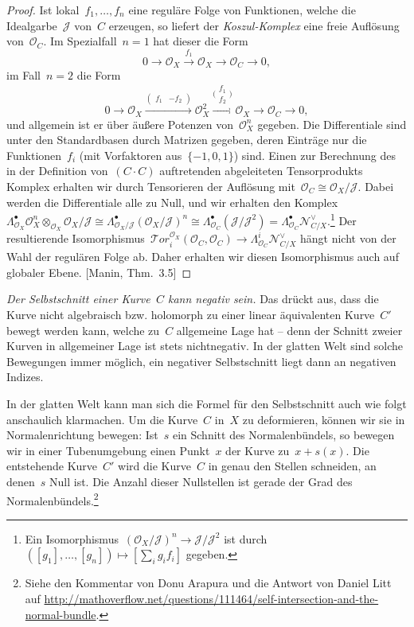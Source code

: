 \documentclass[a4paper,ngerman,12pt]{scrartcl}
\theoremstyle{definition}
\theoremstyle{plain}
\theoremstyle{remark}
\newcommand{\N}{\mathcal{N}}
\newcommand{\J}{\mathcal{J}}
\renewcommand{\O}{\mathcal{O}}
\newcommand{\lra}{\longrightarrow}
\begin{document}
\begin{proof}Ist lokal~$f_1,\ldots,f_n$ eine reguläre Folge von
Funktionen, welche die Idealgarbe~$\J$ von~$C$ erzeugen, so liefert der
\emph{Koszul-Komplex} eine freie Auflösung von~$\O_C$. Im Spezialfall~$n = 1$
hat dieser die Form
\[ 0 \lra \O_X \stackrel{f_1} \lra \O_X \lra \O_C \lra 0, \]
im Fall~$n = 2$ die Form
\[ 0 \lra \O_X \stackrel{(\begin{smallmatrix}f_1&-f_2\end{smallmatrix})} \lra \O_X^2
  \stackrel{\bigl(\begin{smallmatrix}f_1\\f_2\end{smallmatrix}\bigr)}{\lra} \O_X \lra \O_C \lra 0,
  \]
und allgemein ist er über äußere Potenzen von~$\O_X^n$ gegeben. Die Differentiale
sind unter den Standardbasen durch Matrizen gegeben, deren Einträge nur
die Funktionen~$f_i$ (mit Vorfaktoren aus~$\{-1,0,1\}$) sind. Einen zur
Berechnung des in der Definition von~$(C \cdot C)$ auftretenden abgeleiteten
Tensorprodukts Komplex erhalten wir durch Tensorieren der Auflösung mit~$\O_C
\cong \O_X/\J$. Dabei werden die Differentiale alle zu Null, und wir erhalten
den Komplex~$\Lambda^\bullet_{\O_X} \O_X^n \otimes_{\O_X} \O_X/\J \cong
\Lambda^\bullet_{\O_X/\J} (\O_X/\J)^n \cong
\Lambda^\bullet_{\O_C}(\J/\J^2) = \Lambda^\bullet_{\O_C}
\N_{C/X}^\vee$.\footnote{Ein Isomorphismus~$(\O_X/\J)^n \to \J/\J^2$ ist
durch~$([g_1],\ldots,[g_n]) \mapsto [\sum_i g_i f_i]$ gegeben.}
Der resultierende Isomorphismus~$\mathcal{T}\!or^{\O_X}_i(\O_C,\O_C) \to \Lambda^i_{\O_C}
\N_{C/X}^\vee$ hängt nicht von der Wahl der regulären Folge ab. Daher erhalten
wir diesen Isomorphismus auch auf globaler Ebene. [Manin, Thm.~3.5]
\end{proof}

\emph{Der Selbstschnitt einer Kurve~$C$ kann negativ sein.} Das drückt aus, dass
die Kurve nicht algebraisch bzw. holomorph zu einer linear äquivalenten
Kurve~$C'$ bewegt werden kann, welche zu~$C$ allgemeine Lage hat -- denn der
Schnitt zweier Kurven in allgemeiner Lage ist stets nichtnegativ. In der
glatten Welt sind solche Bewegungen immer möglich, ein negativer Selbstschnitt
liegt dann an negativen Indizes.

In der glatten Welt kann man sich die Formel für den Selbstschnitt auch wie
folgt anschaulich klarmachen. Um die Kurve~$C$ in~$X$ zu deformieren, können
wir sie in Normalenrichtung bewegen: Ist~$s$ ein Schnitt des Normalenbündels,
so bewegen wir in einer Tubenumgebung einen Punkt~$x$ der Kurve zu~$x + s(x)$.
Die entstehende Kurve~$C'$ wird die Kurve~$C$ in genau den Stellen schneiden,
an denen~$s$ Null ist. Die Anzahl dieser Nullstellen ist gerade der Grad des
Normalenbündels.\footnote{Siehe den Kommentar von Donu Arapura und die Antwort
von Daniel Litt auf
\url{http://mathoverflow.net/questions/111464/self-intersection-and-the-normal-bundle}.}
\end{document}
